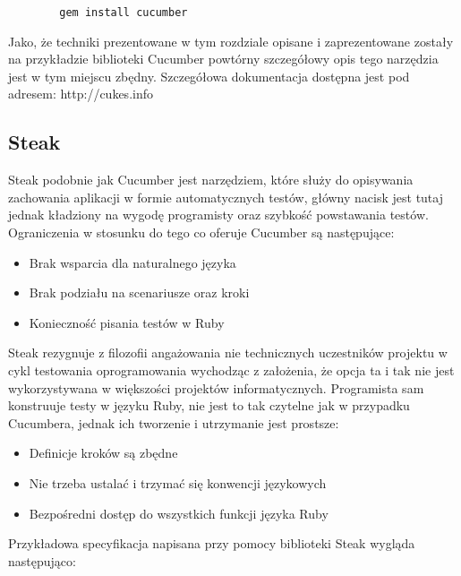       \begin{verbatim}
        gem install cucumber
      \end{verbatim}
      
      Jako, że techniki prezentowane w tym rozdziale opisane i zaprezentowane zostały na przykładzie biblioteki Cucumber powtórny szczegółowy opis tego narzędzia jest w tym miejscu zbędny. Szczegółowa dokumentacja dostępna jest pod adresem: http://cukes.info
      
    \subsection{Steak}
      Steak podobnie jak Cucumber jest narzędziem, które służy do opisywania zachowania aplikacji w formie automatycznych testów, główny nacisk jest tutaj jednak kładziony na wygodę programisty oraz szybkość powstawania testów. Ograniczenia w stosunku do tego co oferuje Cucumber są następujące:
      
      \begin{itemize}
        \item Brak wsparcia dla naturalnego języka
        \item Brak podziału na scenariusze oraz kroki
        \item Konieczność pisania testów w Ruby
      \end{itemize}
      
      Steak rezygnuje z filozofii angażowania nie technicznych uczestników projektu w cykl testowania oprogramowania wychodząc z założenia, że opcja ta i tak nie jest wykorzystywana w większości projektów informatycznych. Programista sam konstruuje testy w języku Ruby, nie jest to tak czytelne jak w przypadku Cucumbera, jednak ich tworzenie i utrzymanie jest prostsze:
      
      \begin{itemize}
        \item Definicje kroków są zbędne
        \item Nie trzeba ustalać i trzymać się konwencji językowych
        \item Bezpośredni dostęp do wszystkich funkcji języka Ruby
      \end{itemize}
      
      Przykładowa specyfikacja napisana przy pomocy biblioteki Steak wygląda następująco:
      
